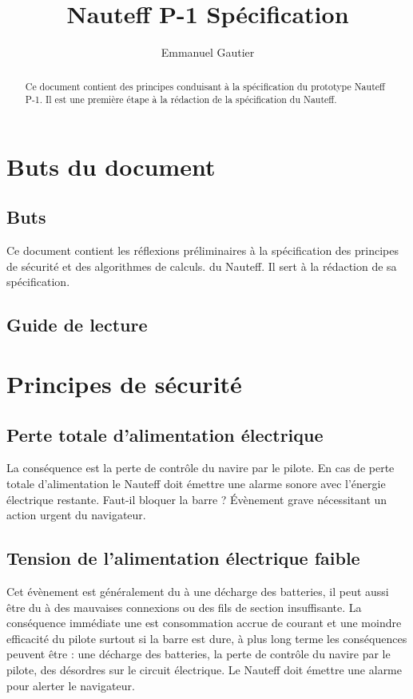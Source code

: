 \documentclass[a4paper,11pt]{report}
\title{Nauteff P-1 Spécification}
\author{Emmanuel Gautier}
\begin{document}
\maketitle

\begin{abstract}
Ce document contient des principes conduisant à la spécification du prototype Nauteff P-1.
Il est une première étape à la rédaction de la spécification du Nauteff.
\end{abstract}

\tableofcontents
\printglossaries

\chapter{Buts du document}
\section{Buts}
Ce document contient les réflexions préliminaires à la spécification 
des principes de sécurité et des algorithmes de calculs.
du Nauteff. Il sert à la rédaction de sa spécification.

\section{Guide de lecture}



\chapter{Principes de sécurité}
\section {Perte totale d'alimentation électrique}
La conséquence est la perte de contrôle du navire par le pilote.
En cas de perte totale d'alimentation le Nauteff doit émettre une alarme
sonore avec l'énergie électrique restante. Faut-il bloquer la barre ?
Évènement grave nécessitant un action urgent du navigateur.

\section {Tension de l'alimentation électrique faible}
Cet évènement est généralement du à une décharge des batteries,
il peut aussi être du à des mauvaises connexions ou des fils de section insuffisante.
La conséquence immédiate une est consommation accrue de courant et une moindre efficacité
du pilote surtout si la barre est dure, à plus long terme les conséquences peuvent être :
une décharge des batteries, la perte de contrôle du navire par le pilote, des désordres
sur le circuit électrique.
Le Nauteff doit émettre une alarme pour alerter le navigateur. 
\end{document}
